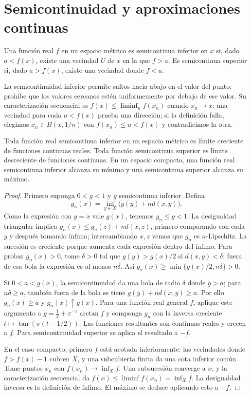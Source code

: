 \section{Semicontinuidad y aproximaciones continuas}
\begin{definicion}
Una función real $f$ en un espacio métrico es semicontinua inferior en $x$ si, dado $a<f(x)$, existe una vecindad $U$ de $x$ en la que $f>a$. Es semicontinua superior si, dado $a>f(x)$, existe una vecindad donde $f<a$.
\end{definicion}
La semicontinuidad inferior permite saltos hacia abajo en el valor del punto; prohíbe que los valores cercanos estén uniformemente por debajo de ese valor. Su caracterización secuencial es $f(x)\le\liminf_nf(x_n)$ cuando $x_n\to x$: una vecindad para cada $a<f(x)$ prueba una dirección; si la definición falla, elegimos $x_n\in B(x,1/n)$ con $f(x_n)\le a<f(x)$ y contradicimos la otra.

\begin{proposicion}\label{prop:v2-aprox-semicont}
Toda función real semicontinua inferior en un espacio métrico es límite creciente de funciones continuas reales. Toda función semicontinua superior es límite decreciente de funciones continuas. En un espacio compacto, una función real semicontinua inferior alcanza su mínimo y una semicontinua superior alcanza su máximo.
\end{proposicion}
\begin{proof}
Primero suponga $0<g<1$ y $g$ semicontinua inferior. Defina
\[g_n(x)=\inf_{y\in X}\bigl(g(y)+n d(x,y)\bigr).\]
Como la expresión con $y=x$ vale $g(x)$, tenemos $g_n\le g<1$. La desigualdad triangular implica $g_n(x)\le g_n(z)+n d(x,z)$, primero comparando con cada $y$ y después tomando ínfimo; intercambiando $x,z$ vemos que $g_n$ es $n$-Lipschitz. La sucesión es creciente porque aumenta cada expresión dentro del ínfimo. Para probar $g_n(x)>0$, tome $\delta>0$ tal que $g(y)>g(x)/2$ si $d(x,y)<\delta$; fuera de esa bola la expresión es al menos $n\delta$. Así $g_n(x)\ge\min\{g(x)/2,n\delta\}>0$.

Si $0<a<g(x)$, la semicontinuidad da una bola de radio $\delta$ donde $g>a$; para $n\delta\ge a$, también fuera de la bola se tiene $g(y)+nd(x,y)\ge a$. Por ello $g_n(x)\ge a$ y $g_n(x)\uparrow g(x)$. Para una función real general $f$, aplique este argumento a $g=\frac12+\pi^{-1}\arctan f$ y componga $g_n$ con la inversa creciente $t\mapsto\tan(\pi(t-1/2))$. Las funciones resultantes son continuas reales y crecen a $f$. Para semicontinuidad superior se aplica el resultado a $-f$.

En el caso compacto, primero $f$ está acotada inferiormente: las vecindades donde $f>f(x)-1$ cubren $X$, y una subcubierta finita da una cota inferior común. Tome puntos $x_n$ con $f(x_n)\to\inf_Xf$. Una subsucesión converge a $x$, y la caracterización secuencial da $f(x)\le\liminf f(x_n)=\inf_Xf$. La desigualdad inversa es la definición de ínfimo. El máximo se deduce aplicando esto a $-f$.
\end{proof}

